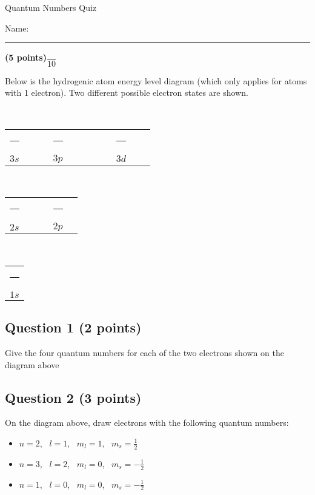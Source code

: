 \documentclass[12pt, letterpaper]{memoir}
\begin{document}
	\begin{center}
		{\large Quantum Numbers Quiz}
	\end{center}
	{\large Name: \rule[-1mm]{4in}{.1pt} {\bfseries (5 points)}\hspace{4em}$\dfrac{~}{10}$} 
	
	
	\noindent Below is the hydrogenic atom energy level diagram (which only applies for atoms with 1 electron). Two different possible electron states are shown.
	\begin{center}
		
		~
		
		{\large
		\begin{tabular}{ccccccccccc}
			\rule[-1pt]{1.75em}{0.5pt} &~&\rule[-1pt]{1.75em}{0.5pt}&\rule[-1pt]{1.75em}{0.5pt}&\rule[-1pt]{1.75em}{0.5pt} &~& \rule[-1pt]{1.75em}{0.5pt}&\rule[-1pt]{1.75em}{0.5pt}&\rule[-1pt]{1.75em}{0.5pt}&\rule[-1pt]{1.75em}{0.5pt}&\rule[-1pt]{1.75em}{0.5pt}\\
			{$3s$} &&&{$3p$} &&&&&{$3d$}
		\end{tabular}
		
		~
		
		\begin{tabular}{ccccc}
			\rule[-1pt]{1.75em}{0.5pt} &~&\rule[-1pt]{1.75em}{0.5pt}&\rule[-1pt]{1.75em}{0.5pt}&\rule[-1pt]{1.75em}{0.5pt}\\
			{$2s$} &&&{$2p$}
		\end{tabular}
		
		~
		
		\begin{tabular}{c}
			\rule[-1pt]{1.75em}{0.5pt} \\
			{$1s$}
		\end{tabular}
		}
	\end{center}

	\subsection*{Question 1 (2 points)}
	Give the four quantum numbers for each of the two electrons shown on the diagram above
	
	\vspace{5em}
	\subsection*{Question 2 (3 points)}
	On the diagram above, draw electrons with the following quantum numbers:
	\begin{itemize}
		\item $n=2$, ~$l=1$, ~$m_l=1$, ~$m_s=\frac{1}{2}$
		\item $n=3$, ~$l=2$, ~$m_l=0$, ~$m_s=-\frac{1}{2}$
		\item $n=1$, ~$l=0$, ~$m_l=0$, ~$m_s=-\frac{1}{2}$
	\end{itemize}
	
\end{document}
